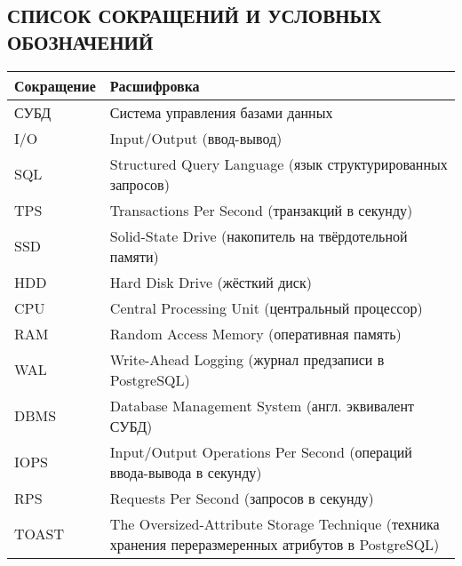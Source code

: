 \begin{center}
     \section*{СПИСОК СОКРАЩЕНИЙ И УСЛОВНЫХ ОБОЗНАЧЕНИЙ}
\end{center}

\begin{table}[h]
\centering
\begin{tabular}{|C{3cm}|L{9cm}|} %
\hline
\textbf{Сокращение} & \textbf{Расшифровка} \\ \hline
СУБД       & Система управления базами данных \\ \hline
I/O        & Input/Output (ввод-вывод) \\ \hline
SQL        & Structured Query Language (язык структурированных запросов) \\ \hline
TPS        & Transactions Per Second (транзакций в секунду) \\ \hline
SSD        & Solid-State Drive (накопитель на твёрдотельной памяти) \\ \hline
HDD        & Hard Disk Drive (жёсткий диск) \\ \hline
CPU        & Central Processing Unit (центральный процессор) \\ \hline
RAM        & Random Access Memory (оперативная память) \\ \hline
WAL        & Write-Ahead Logging (журнал предзаписи в PostgreSQL) \\ \hline
DBMS       & Database Management System (англ. эквивалент СУБД) \\ \hline
IOPS       & Input/Output Operations Per Second (операций ввода-вывода в секунду) \\ \hline
RPS        & Requests Per Second (запросов в секунду) \\ \hline
TOAST      & The Oversized-Attribute Storage Technique (техника хранения переразмеренных атрибутов в PostgreSQL) \\ \hline
\end{tabular}
\end{table}
